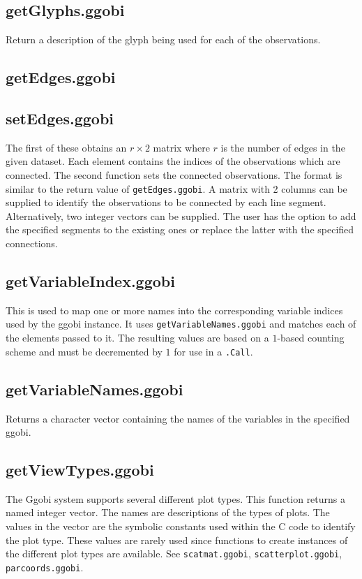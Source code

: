 \documentclass{article}
\def\SFunction#1{{\texttt{\red #1}}}
\begin{document}
\subsection{getGlyphs.ggobi}
Return a description of the glyph
being used for each of the observations.


\subsection{getEdges.ggobi}
\subsection{setEdges.ggobi}
The first of these obtains an $r \times 2$ matrix where $r$ is the
number of edges in the given dataset.  Each element contains
the indices of the observations which are connected.  The second
function sets the connected observations.  The format is similar to
the return value of \SFunction{getEdges.ggobi}.  A matrix with
2 columns can be supplied to identify the observations to be connected
by each line segment.  Alternatively, two integer vectors can be
supplied.  The user has the option to add the specified segments to the
existing ones or replace the latter with the specified connections.

\subsection{getVariableIndex.ggobi}
This is used to map one or more names into the corresponding variable
indices used by the ggobi instance.  It uses
\SFunction{getVariableNames.ggobi} and matches each of the elements
passed to it.  The resulting values are based on a $1$-based counting
scheme and must be decremented by $1$ for use in a \SFunction{.Call}.

\subsection{getVariableNames.ggobi}
Returns  a character vector containing the names of the variables in
the specified ggobi.

\subsection{getViewTypes.ggobi}
The Ggobi system supports several different plot types. This function
returns a named integer vector. The names are descriptions of the
types of plots.  The values in the vector are the symbolic constants
used within the C code to identify the plot type.  These values are
rarely used since functions to create instances of the different plot
types are available.  See \SFunction{scatmat.ggobi},
\SFunction{scatterplot.ggobi}, \SFunction{parcoords.ggobi}.
\end{document}
